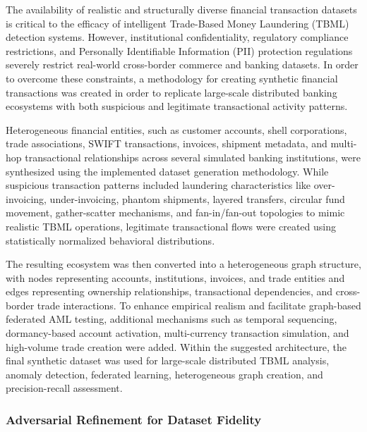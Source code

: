 \documentclass[conference]{IEEEtran}
\begin{document}
The availability of realistic and structurally diverse financial transaction datasets is critical to the efficacy of intelligent Trade-Based Money Laundering (TBML) detection systems. However, institutional confidentiality, regulatory compliance restrictions, and Personally Identifiable Information (PII) protection regulations severely restrict real-world cross-border commerce and banking datasets. In order to overcome these constraints, a methodology for creating synthetic financial transactions was created in order to replicate large-scale distributed banking ecosystems with both suspicious and legitimate transactional activity patterns.

Heterogeneous financial entities, such as customer accounts, shell corporations, trade associations, SWIFT transactions, invoices, shipment metadata, and multi-hop transactional relationships across several simulated banking institutions, were synthesized using the implemented dataset generation methodology. While suspicious transaction patterns included laundering characteristics like over-invoicing, under-invoicing, phantom shipments, layered transfers, circular fund movement, gather-scatter mechanisms, and fan-in/fan-out topologies to mimic realistic TBML operations, legitimate transactional flows were created using statistically normalized behavioral distributions.

The resulting ecosystem was then converted into a heterogeneous graph structure, with nodes representing accounts, institutions, invoices, and trade entities and edges representing ownership relationships, transactional dependencies, and cross-border trade interactions. To enhance empirical realism and facilitate graph-based federated AML testing, additional mechanisms such as temporal sequencing, dormancy-based account activation, multi-currency transaction simulation, and high-volume trade creation were added. Within the suggested architecture, the final synthetic dataset was used for large-scale distributed TBML analysis, anomaly detection, federated learning, heterogeneous graph creation, and precision-recall assessment.

\vspace{0.2cm}
\subsubsection*{\textbf{Adversarial Refinement for Dataset Fidelity}}
\end{document}
